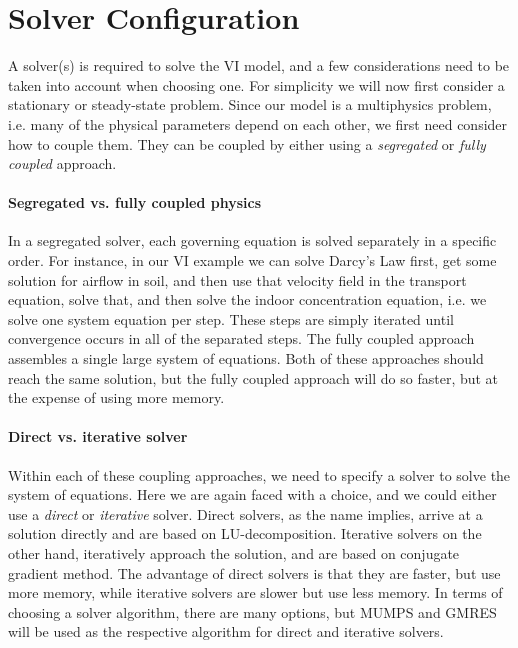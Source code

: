 \section{Solver Configuration}


A solver(s) is required to solve the VI model, and a few considerations need to be taken into account when choosing one.
For simplicity we will now first consider a stationary or steady-state problem.
Since our model is a multiphysics problem, i.e. many of the physical parameters depend on each other, we first need consider how to couple them.
They can be coupled by either using a \textit{segregated} or \textit{fully coupled} approach.\par

\paragraph{Segregated vs. fully coupled physics}

In a segregated solver, each governing equation is solved separately in a specific order.
For instance, in our VI example we can solve Darcy's Law first, get some solution for airflow in soil, and then use that velocity field in the transport equation, solve that, and then solve the indoor concentration equation, i.e. we solve one system equation per step.
These steps are simply iterated until convergence occurs in all of the separated steps.
The fully coupled approach assembles a single large system of equations.
Both of these approaches should reach the same solution, but the fully coupled approach will do so faster, but at the expense of using more memory.\par

\paragraph{Direct vs. iterative solver}
Within each of these coupling approaches, we need to specify a solver to solve the system of equations.
Here we are again faced with a choice, and we could either use a \textit{direct} or \textit{iterative} solver.
Direct solvers, as the name implies, arrive at a solution directly and are based on LU-decomposition.
Iterative solvers on the other hand, iteratively approach the solution, and are based on conjugate gradient method.
The advantage of direct solvers is that they are faster, but use more memory, while iterative solvers are slower but use less memory.
In terms of choosing a solver algorithm, there are many options, but MUMPS and GMRES will be used as the respective algorithm for direct and iterative solvers.\par

